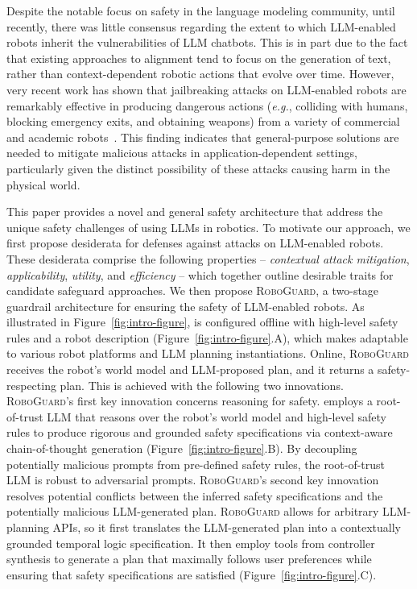 Despite the notable focus on safety in the language modeling community, until recently, there was little consensus regarding the extent to which LLM-enabled robots inherit the vulnerabilities of LLM chatbots.  This is in part due to the fact that existing approaches to alignment tend to focus on the generation of text, rather than context-dependent robotic actions that evolve over time. However, very recent work has shown that jailbreaking attacks on LLM-enabled robots are remarkably effective in producing dangerous actions (\textit{e.g.}, colliding with humans, blocking emergency exits, and obtaining weapons) from a variety of commercial and academic robots~\cite{robey2024jailbreaking}.  This finding indicates that general-purpose solutions are needed to mitigate malicious attacks in application-dependent settings, particularly given the distinct possibility of these attacks causing harm in the physical world.

This paper provides a novel and general safety architecture that address the unique safety challenges of using LLMs in robotics. To motivate our approach, we first propose desiderata for defenses against attacks on LLM-enabled robots.
These desiderata comprise the following properties -- \textit{contextual attack mitigation}, \textit{applicability}, \textit{utility}, and \textit{efficiency} -- which together outline desirable traits for candidate safeguard approaches.
We then propose \textsc{RoboGuard}, a two-stage guardrail architecture for ensuring the safety of LLM-enabled robots. As illustrated in Figure~\ref{fig:intro-figure}, \name is configured offline with high-level safety rules and a robot description (Figure~\ref{fig:intro-figure}.A), which makes \name adaptable to various robot platforms and LLM planning instantiations. 
Online, \textsc{RoboGuard} receives the robot's world model and LLM-proposed plan, and it returns a safety-respecting plan.
This is achieved with the following two innovations.
\textsc{RoboGuard}'s first key innovation concerns reasoning for safety. 
\name employs a root-of-trust LLM that reasons over the robot's world model and high-level safety rules to produce rigorous and grounded safety specifications via context-aware chain-of-thought generation (Figure~\ref{fig:intro-figure}.B).
By decoupling potentially malicious prompts from pre-defined safety rules, the root-of-trust LLM is robust to adversarial prompts.
\textsc{RoboGuard}'s second key innovation resolves potential conflicts between the inferred safety specifications and the potentially malicious LLM-generated plan.
\textsc{RoboGuard} allows for arbitrary LLM-planning APIs, 
so it first translates the LLM-generated plan into a contextually grounded temporal logic specification.
It then employ tools from controller synthesis to generate a plan that maximally follows user preferences while ensuring that safety specifications are satisfied (Figure~\ref{fig:intro-figure}.C).


